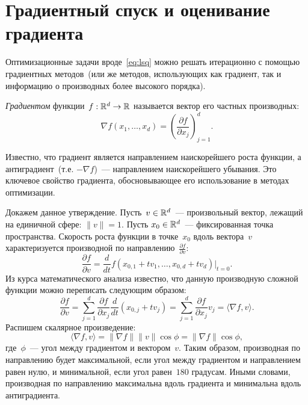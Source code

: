 \documentclass[12pt,fleqn]{article}
\begin{document}
\section{Градиентный спуск и оценивание градиента}

Оптимизационные задачи вроде~\eqref{eq:lsq} можно решать итерационно
с помощью градиентных методов~(или же методов, использующих
как градиент, так и информацию о производных более высокого порядка).

\emph{Градиентом} функции~$f: \mathbb{R}^d \to \mathbb{R}$ называется вектор его частных производных:
\[
    \nabla f(x_1, \dots, x_d) = \left( \frac{\partial f}{\partial x_j} \right)_{j = 1}^{d}.
\]

Известно, что градиент является направлением наискорейшего роста функции,
а антиградиент~(т.е. $-\nabla f$)~--- направлением наискорейшего убывания.
Это ключевое свойство градиента, обосновывающее его использование в методах оптимизации.

Докажем данное утверждение.
Пусть~$v \in \mathbb{R}^d$~--- произвольный вектор, лежащий на единичной сфере: $\|v\| = 1$.
Пусть $x_0 \in \mathbb{R}^d$~--- фиксированная точка пространства.
Скорость роста функции в точке~$x_0$ вдоль вектора~$v$ характеризуется
производной по направлению~$\frac{\partial f}{\partial v}$:
\[
    \frac{\partial f}{\partial v}
    =
    \frac{d}{dt} f(x_{0,1} + t v_1, \dots, x_{0,d} + t v_d) |_{t = 0}.
\]
Из курса математического анализа известно, что данную производную сложной
функции можно переписать следующим образом:
\[
    \frac{\partial f}{\partial v}
    =
    \sum_{j = 1}^{d}
        \frac{\partial f}{\partial x_j}
        \frac{d}{dt} \left(x_{0,j} + t v_j\right)
    =
    \sum_{j = 1}^{d}
        \frac{\partial f}{\partial x_j}
        v_j
    =
    \langle \nabla f, v \rangle.
\]
Распишем скалярное произведение:
\[
    \langle \nabla f, v \rangle
    =
    \|\nabla f\| \|v\| \cos \phi
    =
    \|\nabla f\| \cos \phi,
\]
где~$\phi$~--- угол между градиентом и вектором~$v$.
Таким образом, производная по направлению будет
максимальной, если угол между градиентом и направлением равен нулю,
и минимальной, если угол равен~$180$ градусам.
Иными словами, производная по направлению максимальна
вдоль градиента и минимальна вдоль антиградиента.
\end{document}
